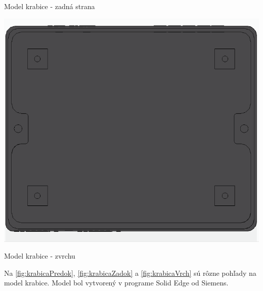 \documentclass[main.tex]{subfiles}
\begin{document}
\begin{multicols*}{2}
\begin{figurehere}
				\caption{Model krabice - zadná strana}
				\label{fig:krabicaZadok}
			\end{figurehere}
			\begin{figurehere}
				\centering
				\includegraphics[width=\linewidth]{../Obrazky/Box03}
				\caption{Model krabice - zvrchu}
				\label{fig:krabicaVrch}
			\end{figurehere}
		
			\noindent Na \cref{fig:krabicaPredok}, \cref{fig:krabicaZadok} a \cref{fig:krabicaVrch} sú rôzne pohľady na model krabice. Model bol vytvorený v programe Solid Edge od Siemens.
		\end{multicols*}
\end{document}
